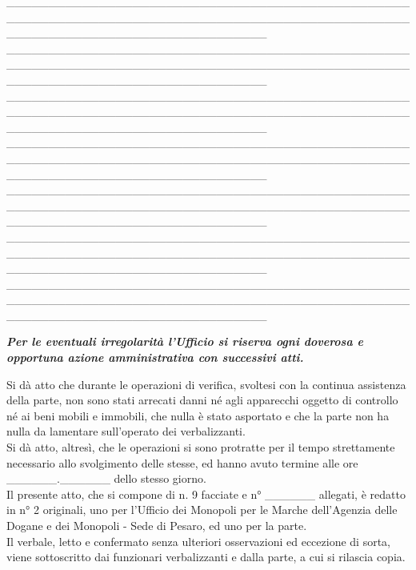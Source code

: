 \documentclass[12pt]{article}
\begin{document}
\_\_\_\_\_\_\_\_\_\_\_\_\_\_\_\_\_\_\_\_\_\_\_\_\_\_\_\_\_\_\_\_\_\_\_\_\_\_\_\_\_\_\_\_\_\_\_\_\_\_\_\_\_\_\_\_\_\_\_\_\_\_\_\_\_\_\_\_\_\_\_\_\_\_\_\_\_\_\_\_\_\_\_\_\_\_\_\_\_\_\_\_\_\_\_\_\_\_\_\_\_\_\_\_\_\_\_\_\_\_\_\_\_\_\_\_\_\_\_\_\_\_\_\_\_\_\_\\
\_\_\_\_\_\_\_\_\_\_\_\_\_\_\_\_\_\_\_\_\_\_\_\_\_\_\_\_\_\_\_\_\_\_\_\_\_\_\_\_\_\_\_\_\_\_\_\_\_\_\_\_\_\_\_\_\_\_\_\_\_\_\_\_\_\_\_\_\_\_\_\_\_\_\_\_\_\_\_\_\_\_\_\_\_\_\_\_\_\_\_\_\_\_\_\_\_\_\_\_\_\_\_\_\_\_\_\_\_\_\_\_\_\_\_\_\_\_\_\_\_\_\_\_\_\_\_\\
\_\_\_\_\_\_\_\_\_\_\_\_\_\_\_\_\_\_\_\_\_\_\_\_\_\_\_\_\_\_\_\_\_\_\_\_\_\_\_\_\_\_\_\_\_\_\_\_\_\_\_\_\_\_\_\_\_\_\_\_\_\_\_\_\_\_\_\_\_\_\_\_\_\_\_\_\_\_\_\_\_\_\_\_\_\_\_\_\_\_\_\_\_\_\_\_\_\_\_\_\_\_\_\_\_\_\_\_\_\_\_\_\_\_\_\_\_\_\_\_\_\_\_\_\_\_\_\\
\_\_\_\_\_\_\_\_\_\_\_\_\_\_\_\_\_\_\_\_\_\_\_\_\_\_\_\_\_\_\_\_\_\_\_\_\_\_\_\_\_\_\_\_\_\_\_\_\_\_\_\_\_\_\_\_\_\_\_\_\_\_\_\_\_\_\_\_\_\_\_\_\_\_\_\_\_\_\_\_\_\_\_\_\_\_\_\_\_\_\_\_\_\_\_\_\_\_\_\_\_\_\_\_\_\_\_\_\_\_\_\_\_\_\_\_\_\_\_\_\_\_\_\_\_\_\_\\
\_\_\_\_\_\_\_\_\_\_\_\_\_\_\_\_\_\_\_\_\_\_\_\_\_\_\_\_\_\_\_\_\_\_\_\_\_\_\_\_\_\_\_\_\_\_\_\_\_\_\_\_\_\_\_\_\_\_\_\_\_\_\_\_\_\_\_\_\_\_\_\_\_\_\_\_\_\_\_\_\_\_\_\_\_\_\_\_\_\_\_\_\_\_\_\_\_\_\_\_\_\_\_\_\_\_\_\_\_\_\_\_\_\_\_\_\_\_\_\_\_\_\_\_\_\_\_\\
\_\_\_\_\_\_\_\_\_\_\_\_\_\_\_\_\_\_\_\_\_\_\_\_\_\_\_\_\_\_\_\_\_\_\_\_\_\_\_\_\_\_\_\_\_\_\_\_\_\_\_\_\_\_\_\_\_\_\_\_\_\_\_\_\_\_\_\_\_\_\_\_\_\_\_\_\_\_\_\_\_\_\_\_\_\_\_\_\_\_\_\_\_\_\_\_\_\_\_\_\_\_\_\_\_\_\_\_\_\_\_\_\_\_\_\_\_\_\_\_\_\_\_\_\_\_\_\\
\_\_\_\_\_\_\_\_\_\_\_\_\_\_\_\_\_\_\_\_\_\_\_\_\_\_\_\_\_\_\_\_\_\_\_\_\_\_\_\_\_\_\_\_\_\_\_\_\_\_\_\_\_\_\_\_\_\_\_\_\_\_\_\_\_\_\_\_\_\_\_\_\_\_\_\_\_\_\_\_\_\_\_\_\_\_\_\_\_\_\_\_\_\_\_\_\_\_\_\_\_\_\_\_\_\_\_\_\_\_\_\_\_\_\_\_\_\_\_\_\_\_\_\_\_\_\_

\textit{\textbf{Per le eventuali irregolarità l'Ufficio si riserva ogni doverosa e opportuna azione amministrativa con successivi atti.}}


Si dà atto che durante le operazioni di verifica, svoltesi con la continua assistenza della parte, non sono stati arrecati danni né agli apparecchi oggetto di controllo né ai beni mobili e immobili, che nulla è stato asportato e che la parte non ha nulla da lamentare sull’operato dei verbalizzanti.\\
Si dà atto, altresì, che le operazioni si sono protratte per il tempo strettamente necessario allo svolgimento delle stesse, ed hanno avuto termine alle ore \_\_\_\_\_\_.\_\_\_\_\_\_ dello stesso giorno.\\
Il presente atto, che si compone di n. 9 facciate e n° \_\_\_\_\_\_ allegati, è redatto in n° 2 originali, uno per l’Ufficio dei Monopoli per le Marche dell’Agenzia delle Dogane e dei Monopoli - Sede di Pesaro, ed uno per la parte.\\
Il verbale, letto e confermato senza ulteriori osservazioni ed eccezione di sorta, viene sottoscritto dai funzionari verbalizzanti e dalla parte, a cui si rilascia copia.\\
\end{document}
